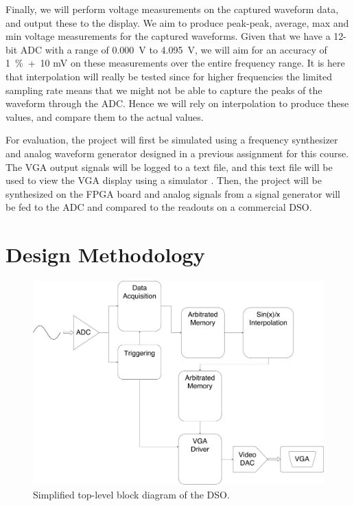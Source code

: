 \documentclass[journal]{IEEEtran}
\begin{document}
Finally, we will perform voltage measurements on the captured waveform data, and output these to the display. We aim to produce peak-peak, average, max and min voltage measurements for the captured waveforms. Given that we have a 12-bit ADC with a range of 0.000~V to 4.095~V, we will aim for an accuracy of 1~\%~+~10 mV on these measurements over the entire frequency range. It is here that interpolation will really be tested since for higher frequencies the limited sampling rate means that we might not be able to capture the peaks of the waveform through the ADC. Hence we will rely on interpolation to produce these values, and compare them to the actual values.

For evaluation, the project will first be simulated using a frequency synthesizer and analog waveform generator designed in a previous assignment for this course. The VGA output signals will be logged to a text file, and this text file will be used to view the VGA display using a simulator \cite{vga_sim}. Then, the project will be synthesized on the FPGA board and analog signals from a signal generator will be fed to the ADC and compared to the readouts on a commercial DSO.

\section{Design Methodology}

\begin{figure}[!htb]
  \centering
  \includegraphics[width=\columnwidth]{diagrams/system.pdf}
  \caption{Simplified top-level block diagram of the DSO.}
  \label{fig:system}
\end{figure}
\end{document}
